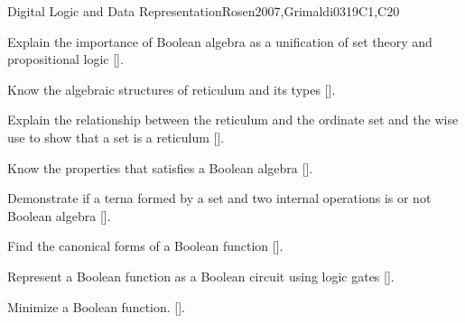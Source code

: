 \begin{syllabus}
\begin{unit}{Digital Logic and Data Representation}{}{Rosen2007,Grimaldi03}{19}{C1,C20}
   \begin{learningoutcomes}
	\item Explain the importance of Boolean algebra as a unification of set theory and propositional logic [\Assessment].
	\item Know the algebraic structures of reticulum and its types [\Assessment].
	\item Explain the relationship between the reticulum and the ordinate set and the wise use to show that a set is a reticulum [\Assessment].
	\item Know the properties that satisfies a Boolean algebra [\Assessment].
	\item Demonstrate if a terna formed by a set and two internal operations is or not Boolean algebra [\Assessment].
	\item Find the canonical forms of a Boolean function  [\Assessment].
	\item Represent a Boolean function as a Boolean circuit using logic gates  [\Assessment].
	\item Minimize a Boolean function. [\Assessment].
    \end{learningoutcomes}
 \end{unit}

\begin{coursebibliography}
\end{coursebibliography}

\end{syllabus}

%
